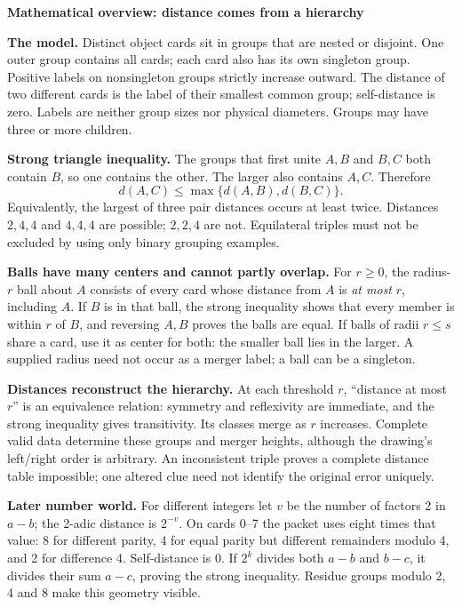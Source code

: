\documentclass[11pt]{article}
\newcommand{\head}[1]{\par\textbf{\large #1}\par}
\begin{document}
\head{Mathematical overview: distance comes from a hierarchy}
\textbf{The model.} Distinct object cards sit in groups that are nested or disjoint. One outer group contains all cards; each card also has its own singleton group. Positive labels on nonsingleton groups strictly increase outward. The distance of two different cards is the label of their smallest common group; self-distance is zero. Labels are neither group sizes nor physical diameters. Groups may have three or more children.

\textbf{Strong triangle inequality.} The groups that first unite $A,B$ and $B,C$ both contain $B$, so one contains the other. The larger also contains $A,C$. Therefore
\[
d(A,C)\le\max\{d(A,B),d(B,C)\}.
\]
Equivalently, the largest of three pair distances occurs at least twice. Distances $2,4,4$ and $4,4,4$ are possible; $2,2,4$ are not. Equilateral triples must not be excluded by using only binary grouping examples.

\textbf{Balls have many centers and cannot partly overlap.} For $r\ge0$, the radius-$r$ ball about $A$ consists of every card whose distance from $A$ is \emph{at most} $r$, including $A$. If $B$ is in that ball, the strong inequality shows that every member is within $r$ of $B$, and reversing $A,B$ proves the balls are equal. If balls of radii $r\le s$ share a card, use it as center for both: the smaller ball lies in the larger. A supplied radius need not occur as a merger label; a ball can be a singleton.

\textbf{Distances reconstruct the hierarchy.} At each threshold $r$, ``distance at most $r$'' is an equivalence relation: symmetry and reflexivity are immediate, and the strong inequality gives transitivity. Its classes merge as $r$ increases. Complete valid data determine these groups and merger heights, although the drawing's left/right order is arbitrary. An inconsistent triple proves a complete distance table impossible; one altered clue need not identify the original error uniquely.

\textbf{Later number world.} For different integers let $v$ be the number of factors 2 in $a-b$; the 2-adic distance is $2^{-v}$. On cards 0--7 the packet uses eight times that value: 8 for different parity, 4 for equal parity but different remainders modulo 4, and 2 for difference 4. Self-distance is 0. If $2^k$ divides both $a-b$ and $b-c$, it divides their sum $a-c$, proving the strong inequality. Residue groups modulo 2, 4 and 8 make this geometry visible.
\end{document}
